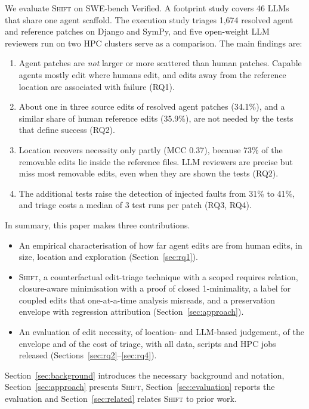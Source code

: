 \documentclass[a4paper,fleqn]{cas-sc}
\newcommand{\tool}{\textsc{Shift}}
\newcommand{\nValidPatches}{1{,}674}
\newcommand{\rqfourCallsMedian}{3}
\newcommand{\rqoneSystems}{46}
\newcommand{\rqthreeSemEnvShort}{41\%}
\newcommand{\rqthreeSemOffShort}{31\%}
\newcommand{\rqtwoAgentSrcUnneeded}{34.1\%}
\newcommand{\rqtwoGoldSrcUnneeded}{35.9\%}
\newcommand{\rqtwoMccPgoldfile}{0.37}
\newcommand{\rqtwoUnneededInGoldShare}{73\%}
\begin{document}
We evaluate \tool{} on SWE-bench Verified. A footprint study covers \rqoneSystems{} LLMs that share one agent scaffold. The execution study triages \nValidPatches{} resolved agent and reference patches on Django and SymPy, and five open-weight LLM reviewers run on two HPC clusters serve as a comparison. The main findings are:
\begin{enumerate}
\item[\textbf{F1}] Agent patches are \emph{not} larger or more scattered than human patches. Capable agents mostly edit where humans edit, and edits away from the reference location are associated with failure (RQ1).
\item[\textbf{F2}] About one in three source edits of resolved agent patches (\rqtwoAgentSrcUnneeded{}), and a similar share of human reference edits (\rqtwoGoldSrcUnneeded{}), are not needed by the tests that define success (RQ2).
\item[\textbf{F3}] Location recovers necessity only partly (MCC \rqtwoMccPgoldfile{}), because \rqtwoUnneededInGoldShare{} of the removable edits lie inside the reference files. LLM reviewers are precise but miss most removable edits, even when they are shown the tests (RQ2).
\item[\textbf{F4}] The additional tests raise the detection of injected faults from \rqthreeSemOffShort{} to \rqthreeSemEnvShort{}, and triage costs a median of \rqfourCallsMedian{} test runs per patch (RQ3, RQ4).
\end{enumerate}

In summary, this paper makes three contributions.
\begin{itemize}
\item An empirical characterisation of how far agent edits are from human edits, in size, location and exploration (Section~\ref{sec:rq1}).
\item \tool{}, a counterfactual edit-triage technique with a scoped requires relation, closure-aware minimisation with a proof of closed 1-minimality, a label for coupled edits that one-at-a-time analysis misreads, and a preservation envelope with regression attribution (Section~\ref{sec:approach}).
\item An evaluation of edit necessity, of location- and LLM-based judgement, of the envelope and of the cost of triage, with all data, scripts and HPC jobs released (Sections~\ref{sec:rq2}--\ref{sec:rq4}).
\end{itemize}
Section~\ref{sec:background} introduces the necessary background and notation, Section~\ref{sec:approach} presents \tool{}, Section~\ref{sec:evaluation} reports the evaluation and Section~\ref{sec:related} relates \tool{} to prior work.
\end{document}
